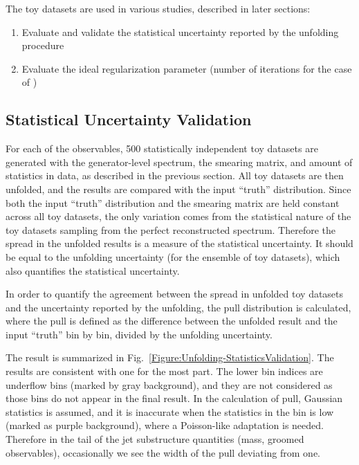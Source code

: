 The toy datasets are used in various studies, described in later sections:
%
\begin{enumerate}
    \item Evaluate and validate the statistical uncertainty reported by the unfolding procedure
    \item Evaluate the ideal regularization parameter (number of iterations for the case of \Bayes)
\end{enumerate}


\subsection{Statistical Uncertainty Validation}

For each of the observables, 500 statistically independent toy datasets are generated with the generator-level spectrum, the smearing matrix, and amount of statistics in data, as described in the previous section.  All toy datasets are then unfolded, and the results are compared with the input ``truth'' distribution.  Since both the input ``truth'' distribution and the smearing matrix are held constant across all toy datasets, the only variation comes from the statistical nature of the toy datasets sampling from the perfect reconstructed spectrum.  Therefore the spread in the unfolded results is a measure of the statistical uncertainty.  It should be equal to the unfolding uncertainty (for the ensemble of toy datasets), which also quantifies the statistical uncertainty.

In order to quantify the agreement between the spread in unfolded toy datasets and the uncertainty reported by the unfolding, the pull distribution is calculated, where the pull is defined as the difference between the unfolded result and the input ``truth'' bin by bin, divided by the unfolding uncertainty.  

The result is summarized in Fig.~\ref{Figure:Unfolding-StatisticsValidation}.  The results are consistent with one for the most part.  The lower bin indices are underflow bins (marked by gray background), and they are not considered as those bins do not appear in the final result.  In the calculation of pull, Gaussian statistics is assumed, and it is inaccurate when the statistics in the bin is low (marked as purple background), where a Poisson-like adaptation is needed.  Therefore in the tail of the jet substructure quantities (mass, groomed observables), occasionally we see the width of the pull deviating from one.

